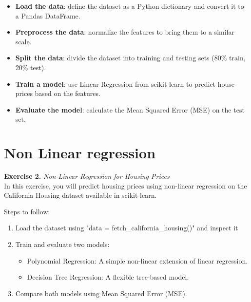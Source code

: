 \documentclass{article}
\begin{document}
\begin{itemize}

\item{\textbf{Load the data}: define the dataset as a Python dictionary and convert it to a Pandas DataFrame.}

\item{\textbf{Preprocess the data}: normalize the features to bring them to a similar scale.}

\item{\textbf{Split the data}: divide the dataset into training and testing sets (80\% train, 20\% test).}

\item{\textbf{Train a model}: use Linear Regression from scikit-learn to predict house prices based on the features.}

\item{\textbf{Evaluate the model}: calculate the Mean Squared Error (MSE) on the test set.}

\end{itemize}

\section*{Non Linear regression}
\noindent \textbf{Exercise 2.} \textit{Non-Linear Regression for Housing Prices} \\

In this exercise, you will predict housing prices using non-linear regression on the California Housing dataset available in scikit-learn.

Steps to follow:

\begin{enumerate}
\item Load the dataset using "data = fetch\_california\_housing()" and inspect it
\item Train and evaluate two models:
\begin{itemize}
\item Polynomial Regression: A simple non-linear extension of linear regression.
\item Decision Tree Regression: A flexible tree-based model.
\end{itemize}
\item Compare both models using Mean Squared Error (MSE).
\end{enumerate}
\end{document}
